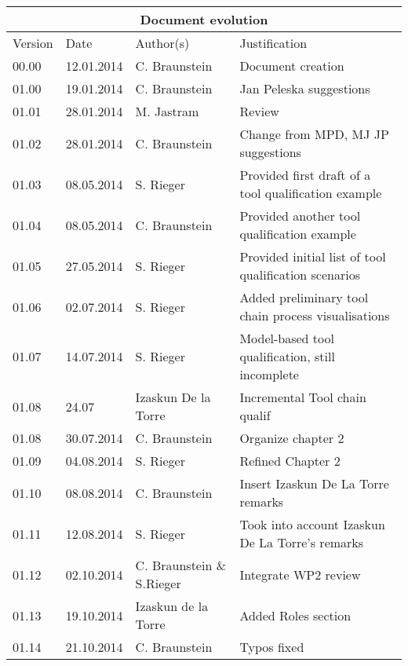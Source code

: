 \documentclass{template/openetcs_report}
\begin{document}
\begin{tabular}{|p{2.2cm}|p{2cm}|p{3cm}|p{5cm}|}
\hline
\multicolumn{4}{|c|}{Document evolution} \\
\hline
Version &  Date & Author(s) & Justification  \\
\hline  
00.00 & 12.01.2014 & C. Braunstein  &  Document creation  \\
01.00 & 19.01.2014 & C. Braunstein  &  Jan Peleska suggestions \\
01.01 & 28.01.2014 & M. Jastram  &  Review \\
01.02 & 28.01.2014 &  C. Braunstein &  Change from MPD, MJ JP suggestions \\
01.03 & 08.05.2014 &  S. Rieger &  Provided first draft of a tool qualification example \\
01.04 & 08.05.2014 &  C. Braunstein  &  Provided  another  tool qualification example \\
01.05 & 27.05.2014 &  S. Rieger &  Provided initial list of tool qualification scenarios\\
01.06 & 02.07.2014 &  S. Rieger &  Added preliminary tool chain process visualisations\\
01.07 & 14.07.2014 &  S. Rieger &  Model-based tool qualification,
still incomplete\\
01.08 & 24.07 & Izaskun De la Torre & Incremental Tool chain qualif \\
01.08 & 30.07.2014 & C. Braunstein & Organize chapter 2 \\
01.09 & 04.08.2014 & S. Rieger & Refined Chapter 2 \\
01.10 & 08.08.2014 & C. Braunstein & Insert Izaskun De La Torre
remarks\\
01.11 & 12.08.2014 & S. Rieger & Took into account Izaskun De La
Torre's remarks\\
01.12 & 02.10.2014 & C. Braunstein \& S.Rieger & Integrate WP2 review\\
01.13 & 19.10.2014 & Izaskun de la Torre & Added Roles section\\
01.14 & 21.10.2014 & C. Braunstein & Typos fixed\\

\hline  
\end{tabular}
\newpage


\mainmatter
\end{document}
